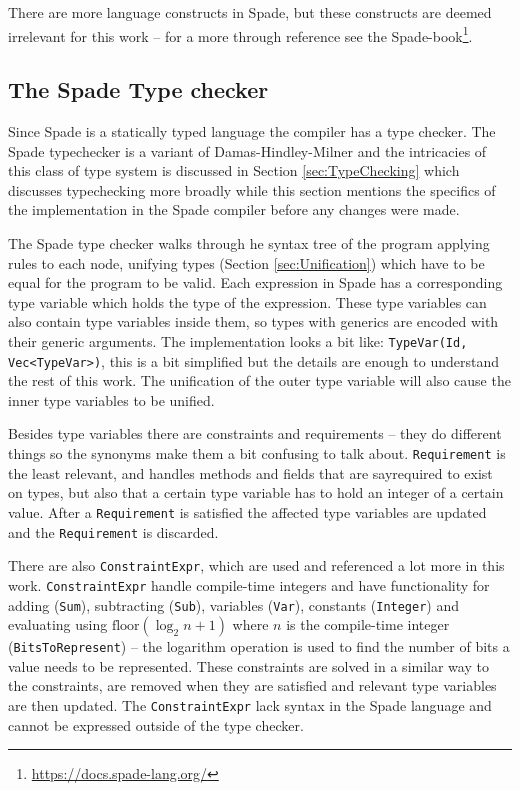 There are more language constructs in Spade, but these constructs are deemed irrelevant for this work -- for a more through reference see the Spade-book\footnote{\url{https://docs.spade-lang.org/}}.

\subsection{The Spade Type checker}
\label{sec:TheSpadeType checker}
Since Spade is a statically typed language the compiler has a type checker. The Spade typechecker is a variant of Damas-Hindley-Milner and the intricacies of this class of type system is discussed in Section \ref{sec:TypeChecking} which discusses typechecking more broadly while this section mentions the specifics of the implementation in the Spade compiler before any changes were made.

The Spade type checker walks through he syntax tree of the program applying rules to each node, unifying types (Section \ref{sec:Unification}) which have to be equal for the program to be valid. Each expression in Spade has a corresponding type variable which holds the type of the expression. These type variables can also contain type variables inside them, so types with generics are encoded with their generic arguments. The implementation looks a bit like: \verb+TypeVar(Id, Vec<TypeVar>)+, this is a bit simplified but the details are enough to understand the rest of this work. The unification of the outer type variable will also cause the inner type variables to be unified.

Besides type variables there are constraints and requirements -- they do different things so the synonyms make them a bit confusing to talk about. \verb+Requirement+ is the least relevant, and handles methods and fields that are say{required} to exist on types, but also that a certain type variable has to hold an integer of a certain value. After a \verb+Requirement+ is satisfied the affected type variables are updated and the \verb+Requirement+ is discarded.

There are also \verb+ConstraintExpr+, which are used and referenced a lot more in this work. \verb+ConstraintExpr+ handle compile-time integers and have functionality for adding (\verb+Sum+), subtracting (\verb+Sub+), variables (\verb+Var+), constants (\verb+Integer+) and evaluating using $\text{floor}(\log_2{n} + 1)$ where $n$ is the compile-time integer (\verb+BitsToRepresent+) -- the logarithm operation is used to find the number of bits a value needs to be represented. These constraints are solved in a similar way to the constraints, are removed when they are satisfied and relevant type variables are then updated. The \verb+ConstraintExpr+ lack syntax in the Spade language and cannot be expressed outside of the type checker.

